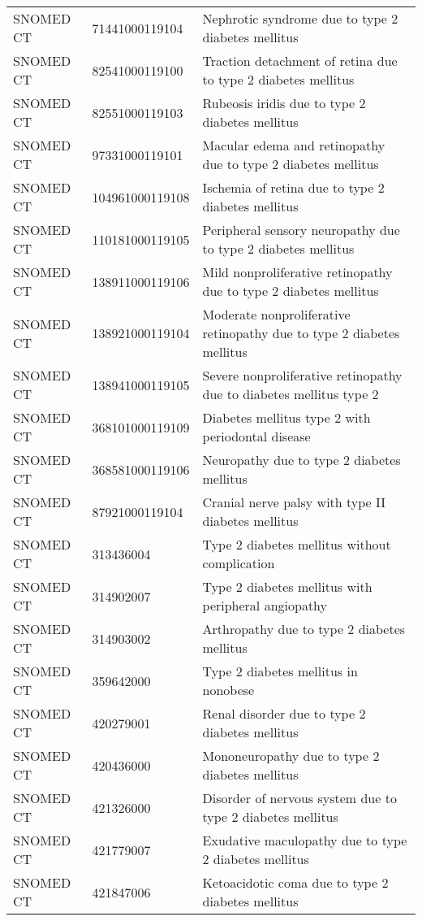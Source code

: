 \begin{longtable}{p{}p{}p{}}
  SNOMED CT & 71441000119104 & Nephrotic syndrome due to type 2 diabetes mellitus \\ 
  SNOMED CT & 82541000119100 & Traction detachment of retina due to type 2 diabetes mellitus \\ 
  SNOMED CT & 82551000119103 & Rubeosis iridis due to type 2 diabetes mellitus \\ 
  SNOMED CT & 97331000119101 & Macular edema and retinopathy due to type 2 diabetes mellitus \\ 
  SNOMED CT & 104961000119108 & Ischemia of retina due to type 2 diabetes mellitus \\ 
  SNOMED CT & 110181000119105 & Peripheral sensory neuropathy due to type 2 diabetes mellitus \\ 
  SNOMED CT & 138911000119106 & Mild nonproliferative retinopathy due to type 2 diabetes mellitus \\ 
  SNOMED CT & 138921000119104 & Moderate nonproliferative retinopathy due to type 2 diabetes mellitus \\ 
  SNOMED CT & 138941000119105 & Severe nonproliferative retinopathy due to diabetes mellitus type 2 \\ 
  SNOMED CT & 368101000119109 & Diabetes mellitus type 2 with periodontal disease \\ 
  SNOMED CT & 368581000119106 & Neuropathy due to type 2 diabetes mellitus \\ 
  SNOMED CT & 87921000119104 & Cranial nerve palsy with type II diabetes mellitus \\ 
  SNOMED CT & 313436004 & Type 2 diabetes mellitus without complication \\ 
  SNOMED CT & 314902007 & Type 2 diabetes mellitus with peripheral angiopathy \\ 
  SNOMED CT & 314903002 & Arthropathy due to type 2 diabetes mellitus \\ 
  SNOMED CT & 359642000 & Type 2 diabetes mellitus in nonobese \\ 
  SNOMED CT & 420279001 & Renal disorder due to type 2 diabetes mellitus \\ 
  SNOMED CT & 420436000 & Mononeuropathy due to type 2 diabetes mellitus \\ 
  SNOMED CT & 421326000 & Disorder of nervous system due to type 2 diabetes mellitus \\ 
  SNOMED CT & 421779007 & Exudative maculopathy due to type 2 diabetes mellitus \\ 
  SNOMED CT & 421847006 & Ketoacidotic coma due to type 2 diabetes mellitus \\ 

\end{longtable}
